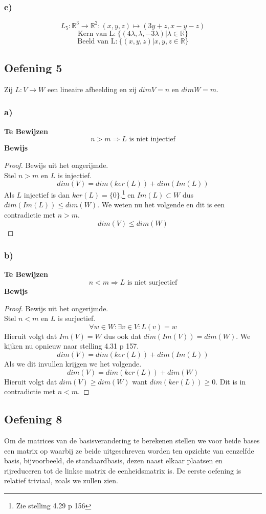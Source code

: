 \documentclass[lineaire_algebra_oplossingen.tex]{subfiles}
\begin{document}
\subsubsection{e)}
$$
L_5:\mathbb{R}^3\rightarrow\mathbb{R}^2:(x,y,z)\mapsto (3y+z,x-y-z)
$$
$$
\text{Kern van L:} \ \{(4\lambda ,\lambda ,-3\lambda)|\lambda \in \mathbb{R} \}
$$
$$
\text{Beeld van L:} \ \{(x ,y ,z)|x,y,z \in \mathbb{R} \}
$$


\subsection{Oefening 5}
Zij $L:V \rightarrow W$ een lineaire afbeelding en zij $dim V = n$ en $dim W = m$.\\
\subsubsection*{a)}
\textbf{Te Bewijzen}
\[
n > m \Rightarrow L \text{ is niet injectief}
\]
\textbf{Bewijs}
\begin{proof}
Bewijs uit het ongerijmde.\\
Stel $n>m$ en $L$ is injectief.
\[
dim(V) = dim(ker(L)) + dim(Im(L))
\]
Als $L$ injectief is dan $ker(L)=\{0\}$.\footnote{Zie stelling 4.29 p 156} en $Im(L) \subset W$ dus $dim(Im(L))\le dim(W)$. We weten nu het volgende en dit is een contradictie met $n>m$.
\[
dim(V) \le dim(W)
\]
\end{proof}
\subsubsection*{b)}
\textbf{Te Bewijzen}
\[
n < m \Rightarrow L \text{ is niet surjectief}
\]
\textbf{Bewijs}
\begin{proof}
Bewijs uit het ongerijmde.\\
Stel $n<m$ en $L$ is surjectief.
\[
\forall w\in W:\exists v\in V: L(v)=w
\]
Hieruit volgt dat $Im(V)=W$ dus ook dat $dim(Im(V))=dim(W)$.
We kijken nu opnieuw naar stelling 4.31 p 157.
\[
dim(V) = dim(ker(L)) + dim(Im(L))
\]
Als we dit invullen krijgen we het volgende.
\[
dim(V) = dim(ker(L)) + dim(W)
\]
Hieruit volgt dat $dim(V) \ge dim(W)$ want $dim(ker(L)) \ge 0$. Dit is in contradictie met $n<m$.
\end{proof}

\subsection{Oefening 8}
Om de matrices van de basisverandering te berekenen stellen we voor beide bases een matrix op waarbij ze beide uitgeschreven worden ten opzichte van eenzelfde basis, bijvoorbeeld, de standaardbasis, dezen naast elkaar plaatsen en rijreduceren tot de linkse matrix de eenheidsmatrix is. De eerste oefening is relatief triviaal, zoals we zullen zien.
\end{document}
